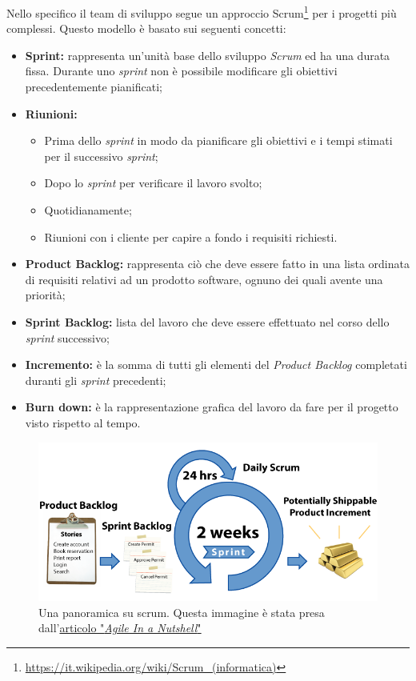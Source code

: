 Nello specifico il team di sviluppo segue un approccio Scrum\footnote{\url{https://it.wikipedia.org/wiki/Scrum_(informatica)}} per i progetti più complessi. Questo modello è basato sui seguenti concetti:
\begin{itemize}
	\item \textbf{Sprint: }rappresenta un'unità base dello sviluppo \textit{Scrum }ed ha una durata fissa. Durante uno \textit{sprint }non è possibile modificare gli obiettivi precedentemente pianificati;
	\item\textbf{Riunioni: }
	\begin{itemize}
		\item Prima dello \textit{sprint }in modo da pianificare gli obiettivi e i tempi stimati per il successivo \textit{sprint};
		\item Dopo lo \textit{sprint }per verificare il lavoro svolto;
		\item Quotidianamente;
		\item Riunioni con i cliente per capire a fondo i requisiti richiesti.
	\end{itemize}
	\item \textbf{Product Backlog: }rappresenta ciò che deve essere fatto in una lista ordinata di requisiti relativi ad un prodotto software, ognuno dei quali avente una priorità;
	\item \textbf{Sprint Backlog: }lista del lavoro che deve essere effettuato nel corso dello \textit{sprint }successivo;
	\item \textbf{Incremento: }è la somma di tutti gli elementi del \textit{Product Backlog }completati duranti gli \textit{sprint} precedenti;
	\item \textbf{Burn down: }è la rappresentazione grafica del lavoro da fare per il progetto visto rispetto al tempo.
\end{itemize}

\begin{figure}[h]
\centering
\includegraphics[width=0.8\linewidth]{immagini/scrum}
\caption[Una panoramica su scrum]{Una panoramica su scrum. Questa immagine è stata presa dall'\href{http://www.agilenutshell.com/scrum}{articolo "\textit{Agile In a Nutshell}"}}
\label{fig:scrum}
\end{figure}


